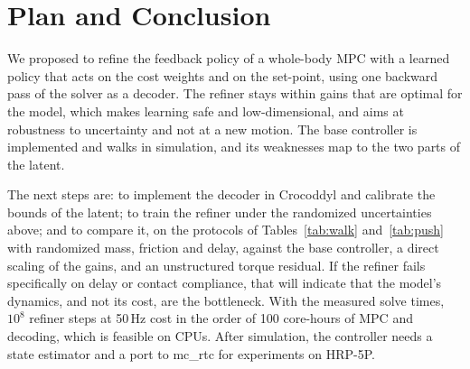 \documentclass[conference]{IEEEtran}
\begin{document}
\section{Plan and Conclusion}
\label{sec:plan}

We proposed to refine the feedback policy of a whole-body MPC with a learned policy that acts on the cost weights and on the set-point, using one backward pass of the solver as a decoder.
The refiner stays within gains that are optimal for the model, which makes learning safe and low-dimensional, and aims at robustness to uncertainty and not at a new motion.
The base controller is implemented and walks in simulation, and its weaknesses map to the two parts of the latent.

The next steps are: to implement the decoder in Crocoddyl and calibrate the bounds of the latent; to train the refiner under the randomized uncertainties above; and to compare it, on the protocols of Tables~\ref{tab:walk} and~\ref{tab:push} with randomized mass, friction and delay, against the base controller, a direct scaling of the gains, and an unstructured torque residual.
If the refiner fails specifically on delay or contact compliance, that will indicate that the model's dynamics, and not its cost, are the bottleneck.
With the measured solve times, $10^8$ refiner steps at 50\,Hz cost in the order of 100 core-hours of MPC and decoding, which is feasible on CPUs.
After simulation, the controller needs a state estimator and a port to mc\_rtc for experiments on HRP-5P.

\begingroup
\renewcommand{\footnotesize}{\fontsize{7.3}{8.3}\selectfont}
\setlength{\itemsep}{0pt}


\endgroup
\end{document}
